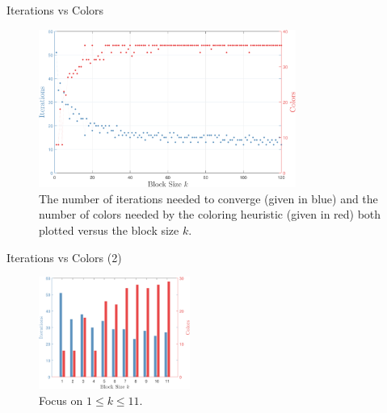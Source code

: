 \documentclass{beamer}
\begin{document}
\begin{frame}{Iterations vs Colors}
\begin{figure}
\centering
\includegraphics[width=0.75\textwidth]{iterations_colors}
\caption{The number of iterations needed to converge (given in blue) and the number of
colors needed by the coloring heuristic (given in red) both plotted versus the block size $k$.}
\end{figure}
\end{frame}
\begin{frame}{Iterations vs Colors (2)}
\begin{figure}
\centering
\includegraphics[width=0.44\textwidth]{zoom_iterations_colors}
\caption{Focus on $1 \leq k \leq 11$.}
\label{f:zoom_iterations_colors}
\end{figure}
\end{frame}
\end{document}
